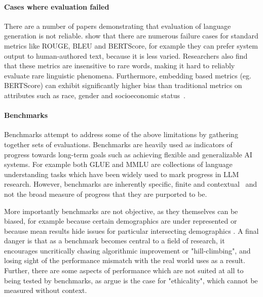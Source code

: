 \paragraph{Cases where evaluation failed}

There are a number of papers demonstrating that evaluation of language generation is not reliable. \citet{caglayan_curious_2020} show that there are numerous failure cases for standard metrics like ROUGE, BLEU and BERTScore, for example they can prefer system output to human-authored text, because it is less varied. Researchers also find that these metrics are insensitive to rare words, making it hard to reliably evaluate rare linguistic phenomena. Furthermore, embedding based metrics (eg. BERTScore) can exhibit significantly higher bias than traditional metrics on attributes such as race, gender and socioeconomic status~\cite{sun_bertscore_2022}. 


\paragraph{Benchmarks}

Benchmarks attempt to address some of the above limitations by gathering together sets of evaluations. 
Benchmarks are heavily used as indicators of progress towards long-term goals such as achieving flexible and generalizable AI systems.  For example both GLUE and MMLU are collections of language understanding tasks which have been widely used to mark progress in LLM research. 
However, benchmarks are inherently specific, finite and contextual~\citep{raji_ai_2021} and not the broad measure of progress that they are purported to be. 

More importantly benchmarks are not objective, as they themselves can be biased, for example because certain demographics are under represented \citep{buolamwini_gender_2018} or because mean results hide issues for particular intersecting demographics \citep{tatman_gender_2017}. %
A final danger is that as a benchmark becomes central to a field of research, it encourages uncritically chasing algorithmic improvement or "hill-climbing", and losing sight of the performance mismatch with the real world uses as a result.  Further, there are some aspects of performance which are not suited at all to being tested by benchmarks, as \citet{lacroix_metaethical_2022} argue is the case for "ethicality", which cannot be measured without context. %


